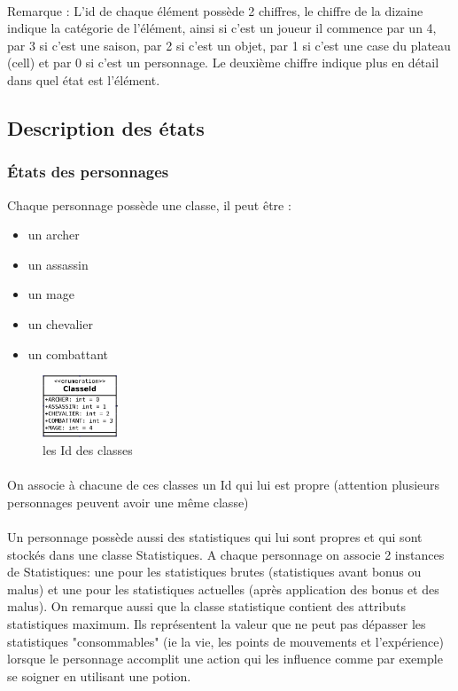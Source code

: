 \documentclass[a4paper,12pt]{article}
\begin{document}
\paragraph{} Remarque : L'id de chaque élément possède 2 chiffres, le chiffre de la dizaine indique la catégorie de l'élément, ainsi si c'est un joueur il commence par un 4, par 3 si c'est une saison, par 2 si c'est un objet, par 1 si c'est une case du plateau (cell) et par 0 si c'est un personnage. Le deuxième chiffre indique plus en détail dans quel état est l'élément.     
\subsection{Description des états}
\subsubsection{États des personnages}
Chaque personnage possède une classe, il peut être :
\begin{itemize}
\item un archer
\item un assassin
\item un mage
\item un chevalier
\item un combattant
\end{itemize}
\begin{figure}[ht]
\begin{center}
\includegraphics[width=0.2\textwidth]{classes.png}
\caption{\label{pacmangame}les Id des classes}
\end{center}
\end{figure}
\paragraph{} On associe à chacune de ces classes un Id qui lui est propre (attention plusieurs personnages peuvent avoir une même classe)
\paragraph{}Un personnage possède aussi des statistiques qui lui sont propres et qui sont stockés dans une classe Statistiques. A chaque personnage on associe 2 instances de Statistiques: une pour les statistiques brutes (statistiques avant bonus ou malus) et une pour les statistiques actuelles (après application des bonus et des malus). On remarque aussi que la classe statistique contient des attributs statistiques maximum. Ils représentent la valeur que ne peut pas dépasser les statistiques "consommables" (ie la vie, les points de mouvements et l'expérience) lorsque le personnage accomplit une action qui les influence comme par exemple se soigner en utilisant une potion.
\end{document}
